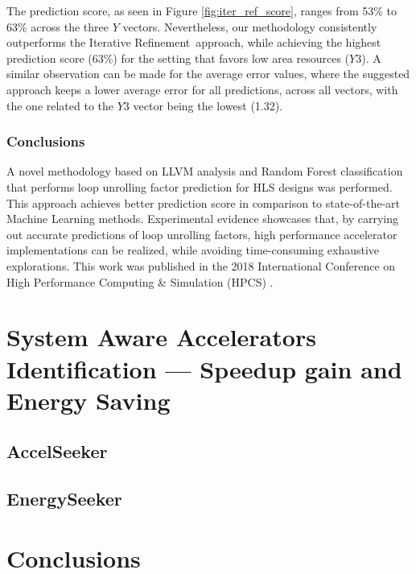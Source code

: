 \documentclass[]{usiinfthesis}
\newcommand{\aseeker}{{AccelSeeker}}
\newcommand{\ItRef}{{Iterative Refinement}}
\begin{document}
The prediction score, as seen in Figure \ref{fig:iter_ref_score}, ranges from 53\% to 63\% across the three 
$Y$ vectors. Nevertheless, our methodology consistently outperforms the \ItRef\ approach, while achieving 
the highest prediction score (63\%) for the setting that favors low area resources ($Y3$). A similar
observation can be made for the average error values, where the suggested approach keeps a lower 
average error for all predictions, across all vectors, with the one related to the $Y3$ vector 
being the lowest (1.32).\par

\subsection{Conclusions}

A novel methodology based on LLVM analysis and Random Forest classification that performs loop unrolling 
factor prediction for HLS designs was performed. This approach achieves better prediction score 
in comparison to state-of-the-art Machine Learning methods. Experimental evidence showcases that, 
by carrying out accurate predictions of loop unrolling factors, high performance accelerator 
implementations can be realized, while avoiding time-consuming exhaustive explorations. This work was 
published in the 2018 International Conference on High Performance Computing \& Simulation (HPCS) 
\cite{ZacharopoulosJul18}.

%
%
%
%
%  
%
%
%
%
%


\chapter[System Aware Accelerators Identification]
{System Aware Accelerators Identification --- Speedup gain and Energy Saving}

\section{\aseeker}

\section{EnergySeeker}

\chapter*{Conclusions}
\end{document}
